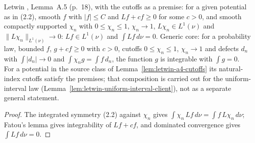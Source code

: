 \begin{lemma}
  \label{lem:letwin-a5-cutoffs}
  \leanok
  Letwin \cite{Letwin2026QuadraticKLS}, Lemma~A.5 (p.~18), with the cutoffs as a premise: for a given potential as in
  (2.2), smooth $f$ with $|f|\le C$ and $Lf+cf\ge0$ for some $c>0$, and smooth compactly supported $\chi_n$ with
  $0\le\chi_n\le1$, $\chi_n\to1$, $L\chi_n\in L^1(\nu)$ and $\|L\chi_n\|_{L^1(\nu)}\to0$: $Lf\in L^1(\nu)$ and
  $\int Lf\,d\nu=0$.  Generic core: for a probability law, bounded $f$, $g+cf\ge0$ with $c>0$, cutoffs $0\le\chi_n\le1$,
  $\chi_n\to1$ and defects $d_n$ with $\int|d_n|\to0$ and $\int\chi_ng=\int f\,d_n$, the function $g$ is integrable with
  $\int g=0$.  For a potential in the source class of Lemma~\ref{lem:letwin-a4-cutoffs} its natural-index cutoffs satisfy
  the premises; that composition is carried out for the uniform-interval law
  (Lemma~\ref{lem:letwin-uniform-interval-client}), not as a separate general statement.
\end{lemma}
\begin{proof}
  \leanok
  The integrated symmetry (2.2) against $\chi_n$ gives $\int\chi_n\,Lf\,d\nu=\int f\,L\chi_n\,d\nu$; Fatou's lemma gives
  integrability of $Lf+cf$, and dominated convergence gives $\int Lf\,d\nu=0$.
\end{proof}

